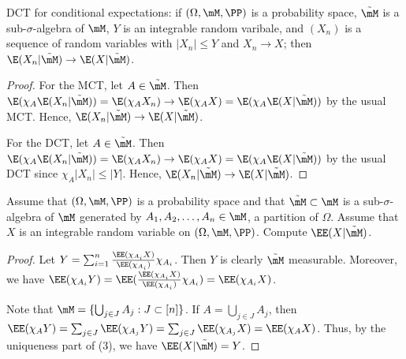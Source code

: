 \documentclass{article}
\begin{document}
DCT for conditional expectations: if $(\Omega, \mM , {\PP})$ is a probability space, $\tilde \mM$ is a sub-$\sigma$-algebra of $\mM$, $Y$ is an integrable random varibale, and $(X_n)$ is a sequence of random variables with $|X_n| \le Y$ and $X_n \to X$; then $\E(X_n | \tilde \mM) \to \E(X | \tilde \mM)$.
\begin{proof}
For the MCT, let $A \in \tilde \mM$.  Then $\E(\chi_A \E(X_n | \tilde \mM)) = \E(\chi_A X_n) \to \E(\chi_A X) = \E(\chi_A \E(X | \tilde \mM))$ by the usual MCT. Hence, $\E(X_n | \tilde \mM) \to \E(X | \tilde \mM)$.

For the DCT, let $A \in \tilde \mM$. Then $\E(\chi_A \E(X_n | \tilde \mM)) = \E(\chi_A X_n) \to \E(\chi_A X) = \E(\chi_A \E(X | \tilde \mM))$ by the usual DCT since $\chi_A |X_n| \le |Y|$. Hence, $\E(X_n | \tilde \mM) \to \E(X | \tilde \mM)$.
\end{proof}

 Assume that $(\Omega, \mM, {\PP})$ is a probability space and that $\tilde \mM \subset \mM$ is a sub-$\sigma$-algebra of $\mM$ generated by $A_1, A_2, \ldots, A_n \in \mM$, a partition of $\Omega$. Assume that $X$ is an integrable random variable on $(\Omega, \mM, {\PP})$. Compute $\EE(X | \tilde \mM)$.
\begin{proof}
Let $Y = \sum_{i=1}^n \frac{\EE(\chi_{A_i} X)} {\EE(\chi_{A_i} )} \chi_{A_i}$.  Then $Y$ is clearly $\tilde \mM$ measurable.  Moreover, we have
$\EE(\chi_{A_i} Y) = \EE(\frac{\EE(\chi_{A_i} X)} {\EE(\chi_{A_i})} \chi_{A_i}) = \EE(\chi_{A_i} X)$. 

Note that $\mM = \{ \bigcup_{j \in J} A_j : J \subset [n]\}$. If $A = \bigcup_{j \in J} A_j$, then $\EE(\chi_A Y) = \sum_{j \in J} \EE(\chi_{A_j} Y) = \sum_{j \in J} \EE(\chi_{A_j} X) = \EE(\chi_A X)$.  Thus, by the uniqueness part of (3), we have $\EE(X | \tilde \mM) = Y$.
\end{proof}
\end{document}
